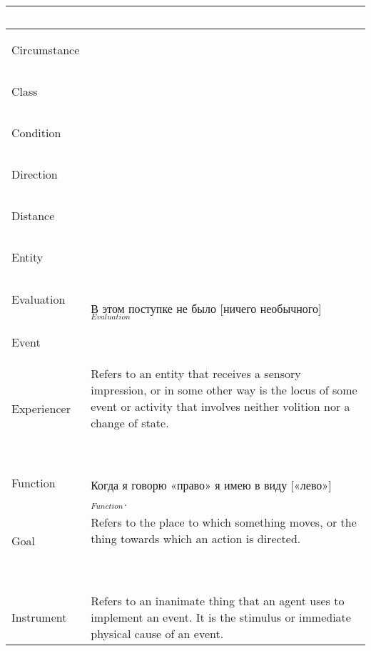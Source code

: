 \documentclass[a4paper,11pt, onecolumn,twoside]{article}
\begin{document}
\begin{longtable}{ p{}  p{} }
        & ~ \\
\midrule
 \multirow{2}{*}{Circumstance} & ~ \\ 
        & ~ \\
\midrule
 \multirow{2}{*}{Class} & ~ \\ 
        & ~ \\
\midrule
 \multirow{2}{*}{Condition} & ~ \\ 
        & ~ \\
\midrule
 \multirow{2}{*}{Direction} & ~ \\ 
        & ~ \\
\midrule
 \multirow{2}{*}{Distance} & ~ \\ 
        & ~ \\
\midrule
 \multirow{2}{*}{Entity} & ~ \\ 
        & ~ \\
\midrule
 \multirow{2}{*}{Evaluation} & ~ \\  
        & В этом поступке не было [ничего необычного]$_{Evaluation}$ \\
\midrule
 \multirow{2}{*}{Event} & ~ \\ 
        & ~ \\
\midrule
 \multirow{2}{*}{Experiencer} & Refers to an entity that receives a sensory impression, or in some other way is the locus of some event or activity that involves neither volition nor a change of state. \\ 
        & ~ \\
\midrule
 \multirow{2}{*}{Function} & ~ \\ 
        & Когда я говорю «право» я имею в виду [«лево»]$_{Function}$. \\
\midrule
 \multirow{2}{*}{Goal} & Refers to the place to which something moves, or the thing towards which an action is directed. \\ 
\midrule
 \multirow{2}{*}{Goer} & ~ \\ 
        & ~ \\
\midrule
 \multirow{2}{*}{Instrument} & Refers to an inanimate thing that an agent uses to implement an event. It is the stimulus or immediate physical cause of an event. \\ 

\end{longtable}
\end{document}
